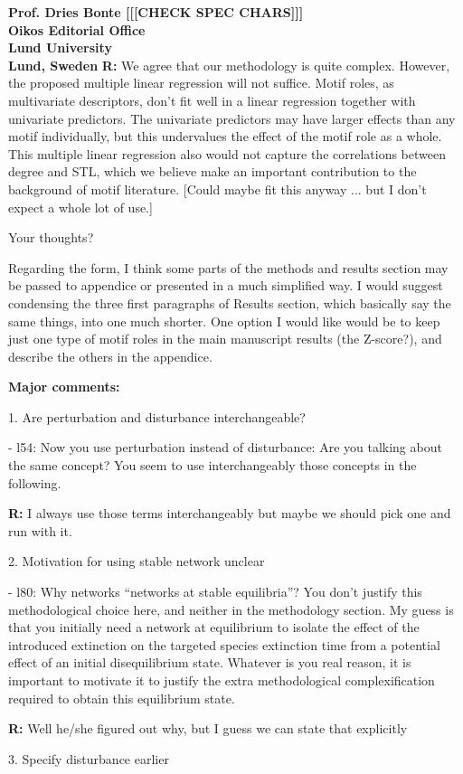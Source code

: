 \documentclass[12pt]{letter}
\begin{document}
\begin{letter}{\bf Prof. Dries Bonte [[[CHECK SPEC CHARS]]]\\
Oikos Editorial Office \\
Lund University \\
Lund, Sweden}
  \textbf{R:} We agree that our methodology is quite complex. However, the proposed multiple linear regression will not suffice. Motif roles, as multivariate descriptors, don't fit well in a linear regression together with univariate predictors. The univariate predictors may have larger effects than any motif individually, but this undervalues the effect of the motif role as a whole. 
  This multiple linear regression also would not capture the correlations between degree and STL, which we believe make an important contribution to the background of motif literature.
  [Could maybe fit this anyway ... but I don't expect a whole lot of use.]


  Your thoughts?

  Regarding the form, I think some parts of the methods and results section may be passed to appendice or presented in a much simplified way. I would suggest condensing the three first paragraphs of Results section, which basically say the same things, into one much shorter. One option I would like would be to keep just one type of motif roles in the main manuscript results (the Z-score?), and describe the others in the appendice.


  \textbf{Major comments:}

    1. Are perturbation and disturbance interchangeable?

      - l54: Now you use perturbation instead of disturbance: Are you talking about the same concept? You seem to use interchangeably those concepts in the following.

      \textbf{R:}
      I always use those terms interchangeably but maybe we should pick one and run with it.


    2. Motivation for using stable network unclear

      - l80: Why networks “networks at stable equilibria”? You don’t justify this methodological choice here, and neither in the methodology section. My guess is that you initially need a network at equilibrium to isolate the effect of the introduced extinction on the targeted species extinction time from a potential effect of an initial disequilibrium state. Whatever is you real reason, it is important to motivate it to justify the extra methodological complexification required to obtain this equilibrium state.

      \textbf{R:}
      Well he/she figured out why, but I guess we can state that explicitly


    3. Specify disturbance earlier


\end{letter}
\end{document}
